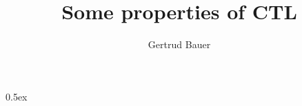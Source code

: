 \documentclass[11pt,a4paper]{article}
\begin{document}
\title{Some properties of CTL}
\author{Gertrud Bauer}
\maketitle

\tableofcontents
\bigskip

\parindent 0pt\parskip 0.5ex
\newcommand{\tweakskip}{\vspace{-\smallskipamount}\vspace{-\parskip}}





\end{document}
